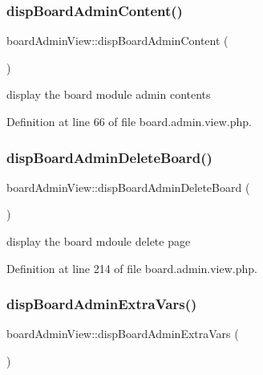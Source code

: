 \subsubsection{\texorpdfstring{disp\+Board\+Admin\+Content()}{dispBoardAdminContent()}}
{\footnotesize\ttfamily board\+Admin\+View\+::disp\+Board\+Admin\+Content (\begin{DoxyParamCaption}{ }\end{DoxyParamCaption})}



display the board module admin contents 



Definition at line 66 of file board.\+admin.\+view.\+php.

\mbox{\label{classboardAdminView_a6db8342036e86100dd74b2af2e027a6f}} 
\subsubsection{\texorpdfstring{disp\+Board\+Admin\+Delete\+Board()}{dispBoardAdminDeleteBoard()}}
{\footnotesize\ttfamily board\+Admin\+View\+::disp\+Board\+Admin\+Delete\+Board (\begin{DoxyParamCaption}{ }\end{DoxyParamCaption})}



display the board mdoule delete page 



Definition at line 214 of file board.\+admin.\+view.\+php.

\mbox{\label{classboardAdminView_a72aace20783257f66fa2eb16ee992ed7}} 
\subsubsection{\texorpdfstring{disp\+Board\+Admin\+Extra\+Vars()}{dispBoardAdminExtraVars()}}
{\footnotesize\ttfamily board\+Admin\+View\+::disp\+Board\+Admin\+Extra\+Vars (\begin{DoxyParamCaption}{ }\end{DoxyParamCaption})}



